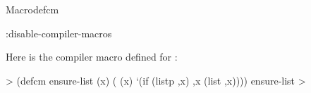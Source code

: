 \documentclass[10pt,twoside,english,pdftex]{article}
\begin{document}
\begin{functiondoc}{Macro}{defcm}{ 
    \superstar
    \returns{} }
\begin{alsos}{:disable-compiler-macros}
\end{alsos}

\fnexample
%
%
%
%
Here is the compiler macro defined for :
%
\W\supp
\begin{example}
  > (defcm ensure-list (x)
      ( (x)
        `(if (listp ,x) ,x (list ,x))))
  ensure-list
  >
\end{example}

\end{functiondoc}

\end{document}
